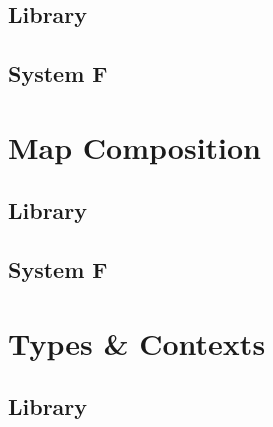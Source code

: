 \documentclass[sigplan,10pt]{acmart}
\newenvironment{LibCode*}{%
  \begin{tcolorbox}[%
    colframe=white,%
    boxrule=0.0pt,%
    top=2.5pt,%
    left=2.5pt,%
    bottom=2.5pt,%
    right=2.5pt,%
    boxsep=0pt%
  ]\vspace{-0.2\baselineskip}%
}{%
  \vspace{-1\baselineskip}%
  \end{tcolorbox}%
}
\newcommand*\LibCode[1]{\begin{LibCode*}{#1}\end{LibCode*}}
\newcommand*\AppCode[1]{{#1}}
\begin{document}
  \LibCode\KKitVar


  \subsection{Library}
  \LibCode\KKitOpenInst
  \LibCode\KEq
  \LibCode\KFunExt
  \LibCode\KIdLift
  \LibCode\KTraversal
  \LibCode\KKitVar
  \LibCode\KKitTerm
  \LibCode\KKitOpen
  \subsection{System F}
  \AppCode\FTraversalOp
  \AppCode\FTraversalId
  \AppCode\FTraversalIdProofInteresting
  \AppCode\FTraversal

  \section{Map Composition}
  \subsection{Library}
  \LibCode\KWkKit
  \LibCode\KWkKitInstances
  \LibCode\KComposeKit
  \LibCode\KComposition
  \LibCode\KComposeKitAp
  \LibCode\KDistLiftCompose
  \LibCode\KComposeKitNotation
  \LibCode\KComposeTraversal
  \LibCode\KCommLiftWeaken
  \LibCode\KCommLiftWeakenTraverse
  \LibCode\KComposeKitInstances
  \LibCode\KComposeKitInstancesConcrete
  \LibCode\KWeakenCancelsSingle
  \LibCode\KWeakenCancelsSingleTraverse
  \LibCode\KDistLiftSingle
  \LibCode\KDistLiftSingleTraverse
  \subsection{System F}
  \AppCode\FAssoc
  \AppCode\FAssocProofInteresting
  \AppCode\FComposeTraversal

  \section{Types \& Contexts}
  \subsection{Library}
  \LibCode\KTypeSorts
  \LibCode\KTypes
  \LibCode\KContextHelper
  \LibCode\KContexts
  \LibCode\KContextLookup
\end{document}
